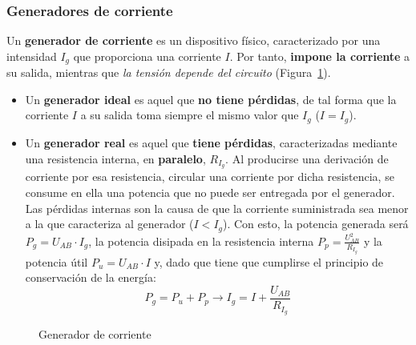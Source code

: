 	\subsubsection{Generadores de corriente}
	Un \textbf{generador de corriente} es un dispositivo físico,
        caracterizado por una intensidad $I_g$ que proporciona una
        corriente $I$. Por tanto, \textbf{impone la corriente} a su
        salida, mientras que \emph{la tensión depende del circuito}
        (Figura~\ref{fig:fuentecorriente}).
	\begin{itemize}
        \item Un \textbf{generador ideal} es aquel que \textbf{no
            tiene pérdidas}, de tal forma que la corriente $I$ a su
          salida toma siempre el mismo valor que $I_g$ ($I=I_g$).
        \item Un \textbf{generador real} es aquel que \textbf{tiene
            pérdidas}, caracterizadas mediante una resistencia
          interna, en \textbf{paralelo}, $R_{I_g}$. Al producirse una
          derivación de corriente por esa resistencia, circular una
          corriente por dicha resistencia, se consume en ella una
          potencia que no puede ser entregada por el generador. Las
          pérdidas internas son la causa de que la corriente
          suministrada sea menor a la que caracteriza al generador
          ($I<I_g$). Con esto, la potencia generada será
          $P_g=U_{AB}\cdot I_g$, la potencia disipada en la
          resistencia interna $P_p=\frac{U_{AB}^2}{R_{I_g}}$ y la
          potencia útil $P_u=U_{AB}\cdot I$ y, dado que tiene que
          cumplirse el principio de conservación de la energía:
          \begin{equation}
            P_g=P_u+P_p\rightarrow \boxed{I_g=I+ \dfrac{U_{AB}}{R_{I_g}}}
          \end{equation}
	\end{itemize}
	\begin{figure}[H]
          \centering
          \hfil
          \caption{Generador de corriente}
          \label{fig:fuentecorriente}
	\end{figure}
	
